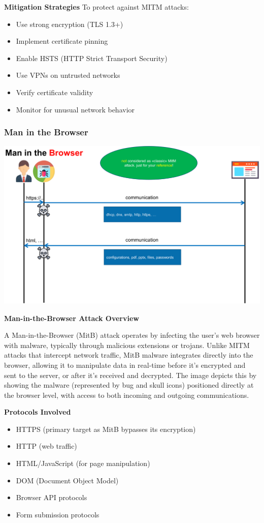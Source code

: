 \textbf{Mitigation Strategies}
To protect against MITM attacks:

\begin{itemize}
    \item Use strong encryption (TLS 1.3+)
    \item Implement certificate pinning
    \item Enable HSTS (HTTP Strict Transport Security)
    \item Use VPNs on untrusted networks
    \item Verify certificate validity
    \item Monitor for unusual network behavior
\end{itemize}

\subsubsection{Man in the Browser}
\begin{center}
\includegraphics[width=\textwidth]{resources/07-mitb.png}
\end{center}
\textbf{Man-in-the-Browser Attack Overview}

A Man-in-the-Browser (MitB) attack operates by infecting the user's web browser with malware, typically through malicious extensions or trojans. Unlike MITM attacks that intercept network traffic, MitB malware integrates directly into the browser, allowing it to manipulate data in real-time before it's encrypted and sent to the server, or after it's received and decrypted. The image depicts this by showing the malware (represented by bug and skull icons) positioned directly at the browser level, with access to both incoming and outgoing communications.

\textbf{Protocols Involved}
\begin{itemize}
    \item HTTPS (primary target as MitB bypasses its encryption)
    \item HTTP (web traffic)
    \item HTML/JavaScript (for page manipulation)
    \item DOM (Document Object Model)
    \item Browser API protocols
    \item Form submission protocols
\end{itemize}

